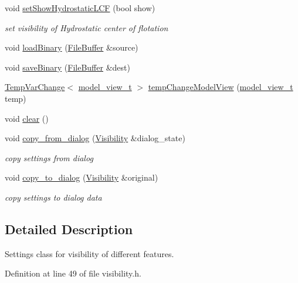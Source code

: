 \begin{DoxyCompactItemize}
void \hyperlink{classShipCAD_1_1Visibility_af7443d243fd0415c749e5816d6158727}{set\+Show\+Hydrostatic\+L\+CF} (bool show)
\begin{DoxyCompactList}\small\item\em set visibility of Hydrostatic center of flotation \end{DoxyCompactList}\item 
void \hyperlink{classShipCAD_1_1Visibility_a418d8fcee4c8f7c0c5c0691249ded677}{load\+Binary} (\hyperlink{classShipCAD_1_1FileBuffer}{File\+Buffer} \&source)
\item 
void \hyperlink{classShipCAD_1_1Visibility_adaf76df822f6f03a93a1b827c81fe58f}{save\+Binary} (\hyperlink{classShipCAD_1_1FileBuffer}{File\+Buffer} \&dest)
\item 
\hyperlink{classShipCAD_1_1TempVarChange}{Temp\+Var\+Change}$<$ \hyperlink{namespaceShipCAD_a742f9cd95e62e207769e17467ecd5bb7}{model\+\_\+view\+\_\+t} $>$ \hyperlink{classShipCAD_1_1Visibility_a5c794da01fd292a34ceec882678aea63}{temp\+Change\+Model\+View} (\hyperlink{namespaceShipCAD_a742f9cd95e62e207769e17467ecd5bb7}{model\+\_\+view\+\_\+t} temp)
\item 
void \hyperlink{classShipCAD_1_1Visibility_af3e925196f71caa8e8ddabd2e7210bbf}{clear} ()
\item 
void \hyperlink{classShipCAD_1_1Visibility_ab8ebd7e609781f3ded96e355b7e2b869}{copy\+\_\+from\+\_\+dialog} (\hyperlink{classShipCAD_1_1Visibility}{Visibility} \&dialog\+\_\+state)
\begin{DoxyCompactList}\small\item\em copy settings from dialog \end{DoxyCompactList}\item 
void \hyperlink{classShipCAD_1_1Visibility_a878236b2beab6140d3d9b880868eb5b7}{copy\+\_\+to\+\_\+dialog} (\hyperlink{classShipCAD_1_1Visibility}{Visibility} \&original)
\begin{DoxyCompactList}\small\item\em copy settings to dialog data \end{DoxyCompactList}\end{DoxyCompactItemize}


\subsection{Detailed Description}
Settings class for visibility of different features. 

Definition at line 49 of file visibility.\+h.



